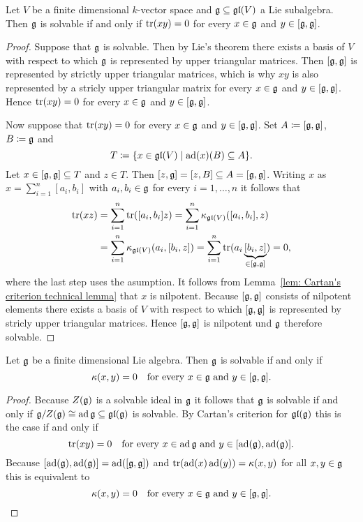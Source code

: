\begin{lem}
 Let $V$ be a finite dimensional $k$-vector space and $\mathfrak{g} \subseteq \mathfrak{gl}(V)$ a Lie subalgebra. Then $\mathfrak{g}$ is solvable if and only if $\operatorname{tr}(xy) = 0$ for every $x \in \mathfrak{g}$ and $y \in [\mathfrak{g},\mathfrak{g}]$.
\end{lem}
\begin{proof}
 Suppose that $\mathfrak{g}$ is solvable. Then by Lie’s theorem there exists a basis of $V$ with respect to which $\mathfrak{g}$ is represented by upper triangular matrices. Then $[\mathfrak{g},\mathfrak{g}]$ is represented by strictly upper triangular matrices, which is why $xy$ is also represented by a stricly upper triangular matrix for every $x \in \mathfrak{g}$ and $y \in [\mathfrak{g},\mathfrak{g}]$. Hence $\operatorname{tr}(xy) = 0$ for every $x \in \mathfrak{g}$ and $y \in [\mathfrak{g},\mathfrak{g}]$.
 
 Now suppose that $\operatorname{tr}(xy) = 0$ for every $x \in \mathfrak{g}$ and $y \in [\mathfrak{g},\mathfrak{g}]$. Set $A \coloneqq [\mathfrak{g},\mathfrak{g}]$, $B \coloneqq \mathfrak{g}$ and
 \[
  T \coloneqq \{x \in \mathfrak{gl}(V) \mid \operatorname{ad}(x)(B) \subseteq A\}.
 \]
 Let $x \in [\mathfrak{g},\mathfrak{g}] \subseteq T$ and $z \in T$. Then $[z,\mathfrak{g}] = [z,B] \subseteq A = [\mathfrak{g},\mathfrak{g}]$. Writing $x$ as $x = \sum_{i=1}^n [a_i, b_i]$ with $a_i, b_i \in \mathfrak{g}$ for every $i = 1, \dotsc, n$ it follows that
 \begin{align*}
  \operatorname{tr}(xz)
  &= \sum_{i=1}^n \operatorname{tr}([a_i, b_i] z)
  = \sum_{i=1}^n \kappa_{\mathfrak{gl}(V)}([a_i, b_i], z) \\
  &= \sum_{i=1}^n \kappa_{\mathfrak{gl}(V)}(a_i, [b_i, z])
  = \sum_{i=1}^n \operatorname{tr}(a_i \underbrace{[b_i, z]}_{\in [\mathfrak{g},\mathfrak{g}]})
  = 0,
 \end{align*}
 where the last step uses the asumption. It follows from Lemma~\ref{lem: Cartan's criterion technical lemma} that $x$ is nilpotent. Because $[\mathfrak{g},\mathfrak{g}]$ consists of nilpotent elements there exists a basis of $V$ with respect to which $[\mathfrak{g},\mathfrak{g}]$ is represented by stricly upper triangular matrices. Hence $[\mathfrak{g},\mathfrak{g}]$ is nilpotent und $\mathfrak{g}$ therefore solvable.
\end{proof}


\begin{thrm}
 Let $\mathfrak{g}$ be a finite dimensional Lie algebra. Then $\mathfrak{g}$ is solvable if and only if
 \[
  \kappa(x,y) = 0 \quad \text{for every $x \in \mathfrak{g}$ and $y \in [\mathfrak{g},\mathfrak{g}]$}.
 \]
\end{thrm}
\begin{proof}
 Because $Z(\mathfrak{g})$ is a solvable ideal in $\mathfrak{g}$ it follows that $\mathfrak{g}$ is solvable if and only if $\mathfrak{g}/Z(\mathfrak{g}) \cong \operatorname{ad} \mathfrak{g} \subseteq \mathfrak{gl}(\mathfrak{g})$ is solvable. By Cartan’s criterion for $\mathfrak{gl}(\mathfrak{g})$ this is the case if and only if
 \[
  \operatorname{tr}(xy) = 0 \quad \text{for every $x \in \operatorname{ad} \mathfrak{g}$ and $y \in [\operatorname{ad}(\mathfrak{g}), \operatorname{ad}(\mathfrak{g})]$}.
 \]
 Because $[\operatorname{ad}(\mathfrak{g}), \operatorname{ad}(\mathfrak{g})] = \operatorname{ad}([\mathfrak{g},\mathfrak{g}])$ and $\operatorname{tr}(\operatorname{ad}(x)\operatorname{ad}(y)) = \kappa(x,y)$ for all $x,y \in \mathfrak{g}$ this is equivalent to
 \[
  \kappa(x,y) = 0 \quad \text{for every $x \in \mathfrak{g}$ and $y \in [\mathfrak{g},\mathfrak{g}]$}.
  \qedhere
 \]
\end{proof}


